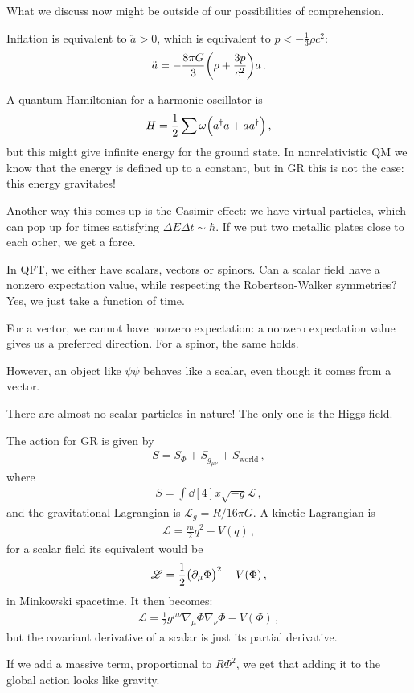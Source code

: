 \documentclass[main.tex]{subfiles}
\begin{document}
What we discuss now might be outside of our possibilities of comprehension.

Inflation is equivalent to \(\ddot{a} > 0 \), which is equivalent to \( p< -\frac{1}{3} \rho c^2\): 
%
\begin{align}
  \ddot{a} = - \frac{8 \pi G}{3} \qty(\rho + \frac{3 p}{c^2})a
\,.
\end{align}

A quantum Hamiltonian for a harmonic oscillator is 
%
\begin{align}
  H = \frac{1}{2} \sum \omega \qty(a ^\dag a + a a ^\dag)
\,,
\end{align}
%
but this might give infinite energy for the ground state.
In nonrelativistic QM we know that the energy is defined up to a constant, but in GR this is not the case: this energy gravitates!

Another way this comes up is the Casimir effect: we have virtual particles, which can pop up for times satisfying \(\Delta E \Delta t \sim \hbar\).
If we put two metallic plates close to each other, we get a force.

In QFT, we either have scalars, vectors or spinors.
Can a scalar field have a nonzero expectation value, while respecting the Robertson-Walker symmetries? Yes, we just take a function of time.

For a vector, we cannot have nonzero expectation: a nonzero expectation value gives us a preferred direction.
For a spinor, the same holds.

However, an object like \(\overline{\psi} \psi \) behaves like a scalar, even though it comes from a vector.

There are almost no scalar particles in nature! The only one is the Higgs field.

The action for GR is given by 
%
\begin{align}
  S = S_{\Phi } + S_{g_{\mu \nu }} + S_{\text{world}}
\,,
\end{align}
%
where 
%
\begin{align}
  S = \int \dd[4]{x} \sqrt{-g} \mathscr{L}
\,,
\end{align}
%
and the gravitational Lagrangian is \(\mathscr{L}_g = R /16 \pi G\).
A kinetic Lagrangian is  
%
\begin{align}
  \mathscr{L}  = \frac{m}{2} \dot{q}^2 - V(q)
\,,
\end{align}
%
for a scalar field its equivalent would be 
%
\begin{align}
  \mathscr{L} = \frac{1}{2} \qty(\partial_{\mu } \Phi )^2-V(\Phi )
\,,
\end{align}
%
in Minkowski spacetime. It then becomes: 
%
\begin{align}
  \mathscr{L} = \frac{1}{2} g^{\mu \nu } \nabla_{\mu } \Phi \nabla_{\nu } \Phi - V(\Phi )
\,,
\end{align}
%
but the covariant derivative of a scalar is just its partial derivative.

If we add a massive term, proportional to \(R \Phi^2\), we get that adding it to the global action looks like gravity.
\end{document}

